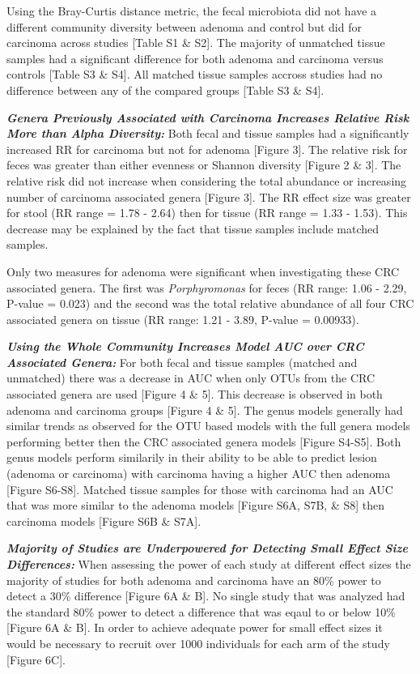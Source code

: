 \documentclass[12pt,]{article}
\begin{document}
Using the Bray-Curtis distance metric, the fecal microbiota did not have
a different community diversity between adenoma and control but did for
carcinoma across studies {[}Table S1 \& S2{]}. The majority of unmatched
tissue samples had a significant difference for both adenoma and
carcinoma versus controls {[}Table S3 \& S4{]}. All matched tissue
samples accross studies had no difference between any of the compared
groups {[}Table S3 \& S4{]}.

\textbf{\emph{Genera Previously Associated with Carcinoma Increases
Relative Risk More than Alpha Diversity:}} Both fecal and tissue samples
had a significantly increased RR for carcinoma but not for adenoma
{[}Figure 3{]}. The relative risk for feces was greater than either
evenness or Shannon diversity {[}Figure 2 \& 3{]}. The relative risk did
not increase when considering the total abundance or increasing number
of carcinoma associated genera {[}Figure 3{]}. The RR effect size was
greater for stool (RR range = 1.78 - 2.64) then for tissue (RR range =
1.33 - 1.53). This decrease may be explained by the fact that tissue
samples include matched samples.

Only two measures for adenoma were significant when investigating these
CRC associated genera. The first was \emph{Porphyromonas} for feces (RR
range: 1.06 - 2.29, P-value = 0.023) and the second was the total
relative abundance of all four CRC associated genera on tissue (RR
range: 1.21 - 3.89, P-value = 0.00933).

\textbf{\emph{Using the Whole Community Increases Model AUC over CRC
Associated Genera:}} For both fecal and tissue samples (matched and
unmatched) there was a decrease in AUC when only OTUs from the CRC
associated genera are used {[}Figure 4 \& 5{]}. This decrease is
observed in both adenoma and carcinoma groups {[}Figure 4 \& 5{]}. The
genus models generally had similar trends as observed for the OTU based
models with the full genera models performing better then the CRC
associated genera models {[}Figure S4-S5{]}. Both genus models perform
similarily in their ability to be able to predict lesion (adenoma or
carcinoma) with carcinoma having a higher AUC then adenoma {[}Figure
S6-S8{]}. Matched tissue samples for those with carcinoma had an AUC
that was more similar to the adenoma models {[}Figure S6A, S7B, \& S8{]}
then carcinoma models {[}Figure S6B \& S7A{]}.

\textbf{\emph{Majority of Studies are Underpowered for Detecting Small
Effect Size Differences:}} When assessing the power of each study at
different effect sizes the majority of studies for both adenoma and
carcinoma have an 80\% power to detect a 30\% difference {[}Figure 6A \&
B{]}. No single study that was analyzed had the standard 80\% power to
detect a difference that was eqaul to or below 10\% {[}Figure 6A \&
B{]}. In order to achieve adequate power for small effect sizes it would
be necessary to recruit over 1000 individuals for each arm of the study
{[}Figure 6C{]}.
\end{document}
